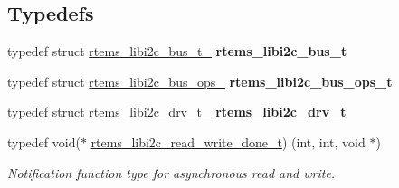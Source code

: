 \subsection*{Typedefs}
\begin{DoxyCompactItemize}
\item 
\mbox{\label{group__libi2c_gaaebab6042d06e863b8bc9cb50499f917}} 
typedef struct \mbox{\hyperlink{structrtems__libi2c__bus__t__}{rtems\+\_\+libi2c\+\_\+bus\+\_\+t\+\_\+}} {\bfseries rtems\+\_\+libi2c\+\_\+bus\+\_\+t}
\item 
\mbox{\label{group__libi2c_ga2fed1f8831bbb55403dde2edd39b9aa4}} 
typedef struct \mbox{\hyperlink{structrtems__libi2c__bus__ops__}{rtems\+\_\+libi2c\+\_\+bus\+\_\+ops\+\_\+}} {\bfseries rtems\+\_\+libi2c\+\_\+bus\+\_\+ops\+\_\+t}
\item 
\mbox{\label{group__libi2c_gaa2b29de8e129122120b0d58816356bd7}} 
typedef struct \mbox{\hyperlink{structrtems__libi2c__drv__t__}{rtems\+\_\+libi2c\+\_\+drv\+\_\+t\+\_\+}} {\bfseries rtems\+\_\+libi2c\+\_\+drv\+\_\+t}
\item 
typedef void($\ast$ \mbox{\hyperlink{group__libi2c_gae9d3e463bdcf351a6d40952c9c57446c}{rtems\+\_\+libi2c\+\_\+read\+\_\+write\+\_\+done\+\_\+t}}) (int, int, void $\ast$)
\begin{DoxyCompactList}\small\item\em Notification function type for asynchronous read and write. \end{DoxyCompactList}\end{DoxyCompactItemize}
